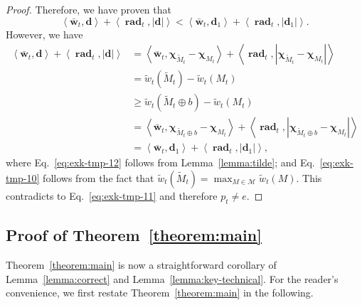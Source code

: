 \documentclass{article}
\newcommand{\M}{\mathcal M}
\DeclareMathOperator{\rad}{rad}
\newcommand{\inn}[1]{\left\langle #1 \right\rangle}
\renewcommand{\vec}[1]{\boldsymbol{#1}}
\begin{document}
\begin{proof}
Therefore, we have proven that 
\begin{equation}
\label{eq:exk-tmp-11}
\inn{\vec {\bar w}_t, \vec d}+\inn{\vec \rad_t,  |\vec d|} < \inn{\vec {\bar w}_t, \vec d_1}+\inn{\vec \rad_t, |\vec d_1|}.
\end{equation}
However, we have
\begin{align}
\inn{\vec {\bar w}_t, \vec d}+\inn{\vec \rad_t,  |\vec d|} 
&= \inn{\vec {\bar w}_t, \vec \chi_{\tilde M_t} - \vec \chi_{M_t}}+\inn{\vec \rad_t,  |\vec \chi_{\tilde M_t} - \vec \chi_{M_t}|} \nonumber \\
&= \tilde w_t(\tilde M_t) - \tilde w_t(M_t)\label{eq:exk-tmp-12}\\
& \ge \tilde w_t(\tilde M_t \oplus b)-\tilde w_t(M_t)\label{eq:exk-tmp-10}\\
&= \inn{\vec {\bar w}_t, \vec \chi_{\tilde M_t \oplus b} - \vec \chi_{M_t}}+\inn{\vec \rad_t,  |\vec \chi_{\tilde M_t \oplus b} - \vec \chi_{M_t}|}\nonumber\\
&= \inn{\vec {\bar w}_t, \vec d_1}+\inn{\vec \rad_t,  |\vec d_1|},
\end{align}
where Eq.~\eqref{eq:exk-tmp-12} follows from Lemma~\ref{lemma:tilde}; and Eq.~\eqref{eq:exk-tmp-10} follows from the fact that $\tilde w_t(\tilde M_t) = \max_{M\in \M} \tilde w_t(M)$.
This contradicts to Eq.~\eqref{eq:exk-tmp-11} and therefore $p_t\not= e$.
\end{proof}


\subsection{Proof of Theorem~\ref{theorem:main}}

Theorem~\ref{theorem:main} is now a straightforward corollary of Lemma~\ref{lemma:correct} and Lemma~\ref{lemma:key-technical}.
For the reader's convenience, we first restate Theorem~\ref{theorem:main} in the following.
\mainresult*
\end{document}
